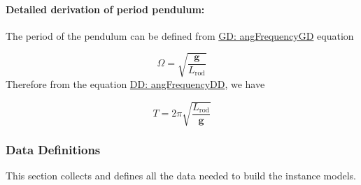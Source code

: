 \documentclass[12pt]{article}
\begin{document}
\paragraph{Detailed derivation of period pendulum:}
\label{GD:periodPendDeriv}
The period of the pendulum can be defined from \hyperref[GD:angFrequencyGD]{GD: angFrequencyGD} equation

\begin{displaymath}
Ω=\sqrt{\frac{\mathbf{g}}{{L_{\text{rod}}}}}
\end{displaymath}
Therefore from the equation \hyperref[DD:angFrequencyDD]{DD: angFrequencyDD}, we have

\begin{displaymath}
T=2 π \sqrt{\frac{{L_{\text{rod}}}}{\mathbf{g}}}
\end{displaymath}
\subsubsection{Data Definitions}
\label{Sec:DDs}
This section collects and defines all the data needed to build the instance models.
\end{document}
